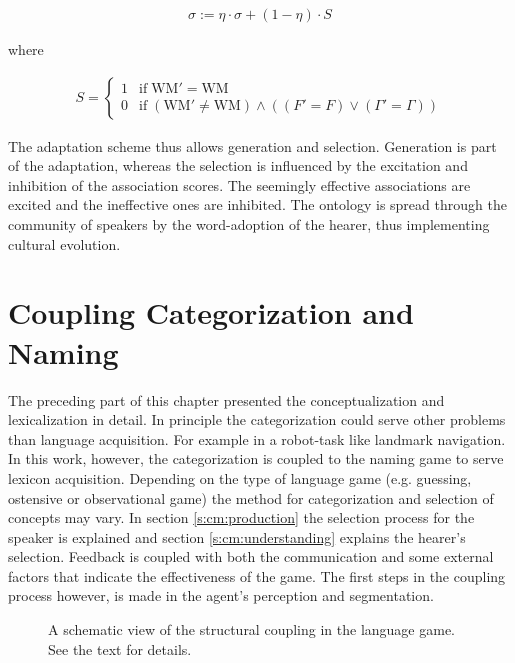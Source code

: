 \begin{description}
\begin{eqnarray}
\sigma := \eta \cdot \sigma + (1 - \eta) \cdot S
\label{e:cm:adapt2}
\end{eqnarray}

\n
where

\begin{eqnarray}
S = \left \{ \begin{array}{rl} 1 & \mbox{if}\; \mbox{WM}' = \mbox{WM} \nonumber\\
0 & \mbox{if}\; (\mbox{WM}' \neq \mbox{WM}) \wedge ((F' = F) \vee (\Gamma' = \Gamma))\nonumber \end{array} \right.
\end{eqnarray}

\end{description}

The adaptation scheme thus allows generation and selection. Generation is part of the adaptation, whereas the selection is influenced by the excitation and inhibition of the association scores. The seemingly effective associations are excited and the ineffective ones are inhibited. The ontology is spread through the community of speakers by the word-adoption of the hearer, thus implementing cultural evolution.

\section{Coupling Categorization and Naming}\label{s:coupling}

The preceding part of this chapter presented the conceptualization and lexicalization in detail. In principle the categorization could serve other problems than language acquisition. For example in a robot-task like landmark navigation. In this work, however, the categorization is coupled to the naming game to serve lexicon acquisition. Depending on the type of language game (e.g. guessing, ostensive or observational game) the method for categorization and selection of concepts may vary. In section \ref{s:cm:production} the selection process for the speaker is explained and section \ref{s:cm:understanding} explains the hearer's selection. Feedback is coupled with both the communication and some external factors that indicate the effectiveness of the game. The first steps in the coupling process however, is made in the agent's perception and segmentation.

\begin{figure}
\caption{A schematic view of the structural coupling in the language game. See the text for details.}
\label{f:coupling}
\end{figure}


